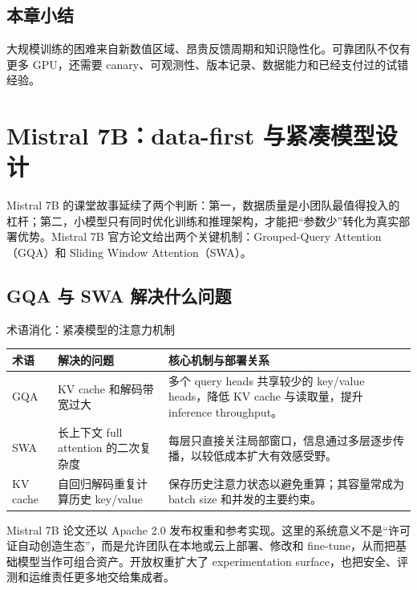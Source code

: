\documentclass[a4paper]{article}
\begin{document}

\subsection{本章小结}

大规模训练的困难来自新数值区域、昂贵反馈周期和知识隐性化。可靠团队不仅有更多 GPU，还需要 canary、可观测性、版本记录、数据能力和已经支付过的试错经验。

\section{Mistral 7B：data-first 与紧凑模型设计}

Mistral 7B 的课堂故事延续了两个判断：第一，数据质量是小团队最值得投入的杠杆；第二，小模型只有同时优化训练和推理架构，才能把“参数少”转化为真实部署优势。Mistral 7B 官方论文给出两个关键机制：Grouped-Query Attention（GQA）和 Sliding Window Attention（SWA）。

\subsection{GQA 与 SWA 解决什么问题}

\begin{knowledgebox}{术语消化：紧凑模型的注意力机制}
\begin{tabularx}{\textwidth}{L{0.18\textwidth}>{\raggedright\arraybackslash}X>{\raggedright\arraybackslash}X}
\toprule
术语 & 解决的问题 & 核心机制与部署关系 \\
\midrule
GQA & KV cache 和解码带宽过大 & 多个 query heads 共享较少的 key/value heads，降低 KV cache 与读取量，提升 inference throughput。 \\
SWA & 长上下文 full attention 的二次复杂度 & 每层只直接关注局部窗口，信息通过多层逐步传播，以较低成本扩大有效感受野。 \\
KV cache & 自回归解码重复计算历史 key/value & 保存历史注意力状态以避免重算；其容量常成为 batch size 和并发的主要约束。 \\
\bottomrule
\end{tabularx}
\end{knowledgebox}

Mistral 7B 论文还以 Apache 2.0 发布权重和参考实现。这里的系统意义不是“许可证自动创造生态”，而是允许团队在本地或云上部署、修改和 fine-tune，从而把基础模型当作可组合资产。开放权重扩大了 experimentation surface，也把安全、评测和运维责任更多地交给集成者。
\end{document}

